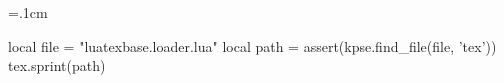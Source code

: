 \documentclass{article}
\begin{document}
\hsize=.1cm
\def\p#1{#1\par }
\begin{luacode}
  local file = "luatexbase.loader.lua"
  local path = assert(kpse.find_file(file, 'tex'))
  tex.sprint(path)
\end{luacode}
\makeatother
\end{document}
